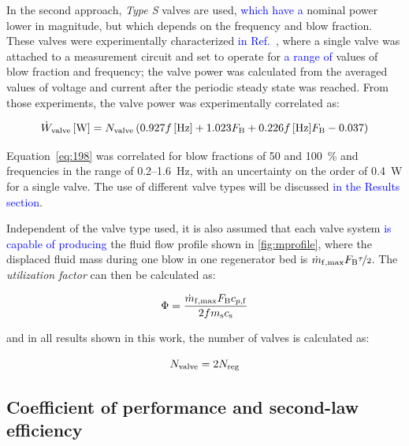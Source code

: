 \documentclass[referee]{svjour3}
\begin{document}
In the second approach, \emph{Type S} valves are used, \textcolor{blue}{which have a} nominal power lower in magnitude, but which depends on the  frequency and blow fraction. These valves were experimentally characterized \textcolor{blue}{in Ref.~\cite{bib:cardoso18}}, where a single valve was attached to a measurement circuit and set to operate for \textcolor{blue}{a range of} values of blow fraction and frequency; the valve power was calculated from the averaged values of voltage and current after the periodic steady state was reached. From those experiments, the valve power was experimentally correlated as:

\begin{equation}
  \label{eq:198}
  \dot{W}_{\mathrm{valve}}\,[\si{\watt}]= N_{\mathrm{valve}}\left(0.927 f\,[\si{\hertz}] + 1.023 F_{\mathrm{B}} + 0.226 f\,[\si{\hertz}] F_{\mathrm{B}} - 0.037\right)
\end{equation}

Equation~\eqref{eq:198} was correlated for blow fractions of \num{50} and \SI{100}{\percent} and frequencies in the range of \num{0.2}--\SI{1.6}{\hertz}, with an uncertainty on the order of \SI{0.4}{\watt} for a single valve. The use of different valve types will be discussed \textcolor{blue}{in the Results section}.

Independent of the valve type used, it is also assumed that each valve system \textcolor{blue}{is capable of producing} the fluid flow profile shown in \autoref{fig:mprofile}, where the displaced fluid mass during one blow in one regenerator bed is $\dot{m}_{\mathrm{f,max}} F_{\mathrm{B}} \nicefrac{\tau}{2}$. The \emph{utilization factor} can then be calculated as:

\begin{equation}
  \label{eq:110}
  \Phi = \frac{\dot{m}_{\mathrm{f,max}} F_{\mathrm{B}} c_{p,\mathrm{f}}}{2 f m_{\mathrm{s}} c_{\mathrm{s}}}
\end{equation}

\noindent and in all results shown in this work, the number of valves is calculated as:

\begin{equation}
  \label{eq:111}
  N_{\mathrm{valve}} = 2 N_{\mathrm{reg}}
\end{equation}

\subsection{Coefficient of performance and second-law efficiency}
\label{sec:calc-coeff-perf}
\end{document}
